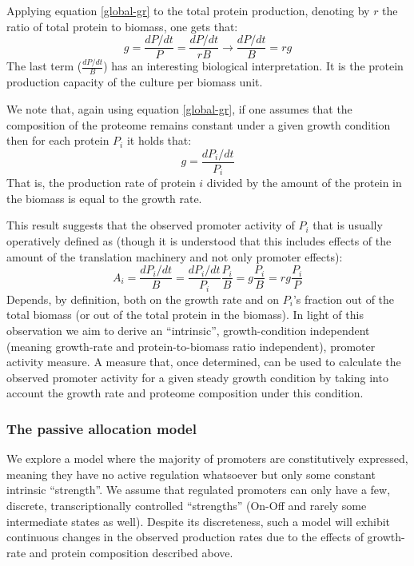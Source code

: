 \documentclass{report}
\begin{document}
Applying equation \ref{global-gr} to the total protein production, denoting by $r$ the ratio of total protein to biomass, one gets that:
\[g=\frac{dP/dt}{P}=\frac{dP/dt}{rB}\rightarrow\frac{dP/dt}{B}=rg\]
The last term ($\frac{dP/dt}{B}$) has an interesting biological interpretation.
It is the protein production capacity of the culture per biomass unit.

We note that, again using equation \ref{global-gr}, if one assumes that the composition of the proteome remains constant under a given growth condition then for each protein $P_i$ it holds that:
\[g=\frac{dP_i/dt}{P_i}\]
That is, the production rate of protein $i$ divided by the amount of the protein in the biomass is equal to the growth rate.

This result suggests that the observed promoter activity of $P_i$ that is usually operatively defined as (though it is understood that this includes effects of the amount of the translation machinery and not only promoter effects):
\[A_i=\frac{dP_i/dt}{B}=\frac{dP_i/dt}{P_i}\frac{P_i}{B}=g\frac{P_i}{B}=rg\frac{P_i}{P}\]
Depends, by definition, both on the growth rate and on $P_i$’s fraction out of the total biomass (or out of the total protein in the biomass).
In light of this observation we aim to derive an “intrinsic”, growth-condition independent (meaning growth-rate and protein-to-biomass ratio independent), promoter activity measure.
A measure that, once determined, can be used to calculate the observed promoter activity for a given steady growth condition by taking into account the growth rate and proteome composition under this condition.
\subsubsection{The passive allocation model}
We explore a model where the majority of promoters are constitutively expressed, meaning they have no active regulation whatsoever but only some constant intrinsic “strength”.
We assume that regulated promoters can only have a few, discrete, transcriptionally controlled “strengths” (On-Off and rarely some intermediate states as well).
Despite its discreteness, such a model will exhibit continuous changes in the observed production rates due to the effects of growth-rate and protein composition described above.
\end{document}
